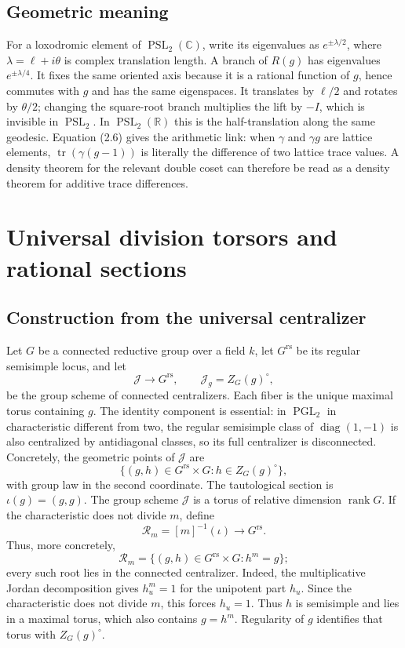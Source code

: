 \documentclass[11pt,reqno]{amsart}
\theoremstyle{definition}
\theoremstyle{remark}
\newcommand{\R}{\mathbb R}
\newcommand{\C}{\mathbb C}
\newcommand{\cR}{\mathcal R}
\newcommand{\cJ}{\mathcal J}
\newcommand{\Tr}{\operatorname{tr}}
\newcommand{\PSL}{\operatorname{PSL}}
\newcommand{\PGL}{\operatorname{PGL}}
\newcommand{\diag}{\operatorname{diag}}
\newcommand{\rs}{\mathrm{rs}}
\begin{document}
\subsection{Geometric meaning}

For a loxodromic element of \(\PSL_2(\C)\), write its eigenvalues as
\(e^{\pm\lambda/2}\), where \(\lambda=\ell+i\theta\) is complex translation
length.  A branch of \(R(g)\) has eigenvalues \(e^{\pm\lambda/4}\).  It fixes
the same oriented axis because it is a rational function of \(g\), hence
commutes with \(g\) and has the same eigenspaces.  It translates by
\(\ell/2\) and rotates by \(\theta/2\); changing the square-root branch
multiplies the lift by \(-I\), which is invisible in \(\PSL_2\).  In
\(\PSL_2(\R)\) this is the half-translation along the same geodesic.
Equation (2.6) gives the arithmetic link: when \(\gamma\) and
\(\gamma g\) are lattice elements, \(\Tr(\gamma(g-1))\) is literally the
difference of two lattice trace values.  A density theorem for the relevant
double coset can therefore be read as a density theorem for additive trace
differences.

\section{Universal division torsors and rational sections}

\subsection{Construction from the universal centralizer}

Let \(G\) be a connected reductive group over a field \(k\), let
\(G^{\rs}\) be its regular semisimple
locus, and let
\[
 \cJ\longrightarrow G^{\rs},\qquad \cJ_g=Z_G(g)^\circ,
\]
be the group scheme of connected centralizers.  Each fiber is the unique
maximal torus containing \(g\).  The identity component is essential:
in \(\PGL_2\) in characteristic different from two, the regular semisimple
class of \(\diag(1,-1)\) is also
centralized by antidiagonal classes, so its full centralizer is disconnected.
Concretely, the geometric points of \(\cJ\) are
\[
 \{(g,h)\in G^{\rs}\times G:h\in Z_G(g)^\circ\},
\]
with group law in the second coordinate.  The tautological section is
\(\iota(g)=(g,g)\).
The group scheme \(\cJ\) is a torus of relative dimension
\(\operatorname{rank}G\).  If the
characteristic does not divide \(m\), define
\[
 \cR_m=[m]^{-1}(\iota)\longrightarrow G^{\rs}.
\tag{3.1}
\]
Thus, more concretely,
\[
 \cR_m=\{(g,h)\in G^{\rs}\times G:h^m=g\};
\]
every such root lies in the connected centralizer.  Indeed, the multiplicative
Jordan decomposition gives \(h_u^m=1\) for the unipotent part \(h_u\).
Since the characteristic does not divide \(m\), this forces \(h_u=1\).
Thus \(h\) is semisimple and lies in a maximal torus, which also contains
\(g=h^m\).  Regularity of \(g\) identifies that torus with \(Z_G(g)^\circ\).
\end{document}
